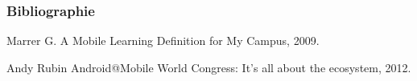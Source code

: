 \documentclass[15pt]{beamer}
\begin{document}

\begin{frame}
\frametitle{Bibliographie}

\begin{thebibliography}{10}
  Marrer G.
  \newblock A Mobile Learning Definition for My Campus, 2009.

  Andy Rubin
  \newblock Android@Mobile World Congress: It’s all about the ecosystem, 2012.

\end{thebibliography}

\end{frame}

\end{document}
